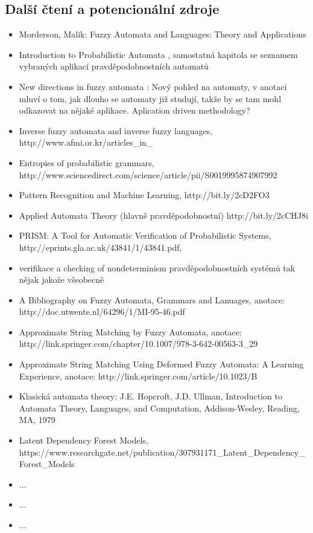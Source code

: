 \documentclass[a4paper,10pt]{article}
\begin{document}
\subsection{Další čtení a potencionální zdroje}
\begin{itemize}
 \item Morderson, Malik: Fuzzy Automata and Languages: Theory and Applications \cite{MorMal-FuzzAutAndLangs}
 \item Introduction to Probabilistic Automata \cite{Paz-IntroProbAut}, samostatná kapitola se seznamem vybraných aplikací pravděpodobnostních automatů
 \item New directions in fuzzy automata \cite{DooKre-NewDirFuzzAut}: Nový pohled na automaty, v anotaci mluví o tom, jak dlouho se automaty již studují, takže by se tam mohl odkazovat na nějaké aplikace. Aplication driven methodology?
 \item Inverse fuzzy automata and inverse fuzzy languages, http://www.afmi.or.kr/articles\_in\_%
 \item Entropies of probabilistic grammars, http://www.sciencedirect.com/science/article/pii/S0019995874907992
 \item Pattern Recognition and Machine Learning, http://bit.ly/2cD2FO3
 \item Applied Automata Theory (hlavně pravděpodobnostní) http://bit.ly/2cCHJ8i
 \item PRISM: A Tool for Automatic Verification of Probabilistic Systems, http://eprints.gla.ac.uk/43841/1/43841.pdf,
 \item verifikace a checking of nondeterminism pravděpodobnostních systémů tak nějak jakože všeobecně
 \item A Bibliography on Fuzzy Automata, Grammars and Lanuages, anotace: http://doc.utwente.nl/64296/1/MI-95-46.pdf
 \item Approximate String Matching by Fuzzy Automata, anotace: http://link.springer.com/chapter/10.1007/978-3-642-00563-3\_29
 \item Approximate String Matching Using Deformed Fuzzy Automata: A Learning Experience, anotace: http://link.springer.com/article/10.1023/B%
 \item Klasická automata theory: J.E. Hopcroft, J.D. Ullman, Introduction to Automata Theory, Languages, and Computation, Addison-Wesley, Reading,
MA, 1979
 \item Latent Dependency Forest Models, https://www.researchgate.net/publication/307931171_Latent_Dependency_Forest_Models
 \item ...
 \item ...
 \item ...
 
\end{itemize}
\end{document}
